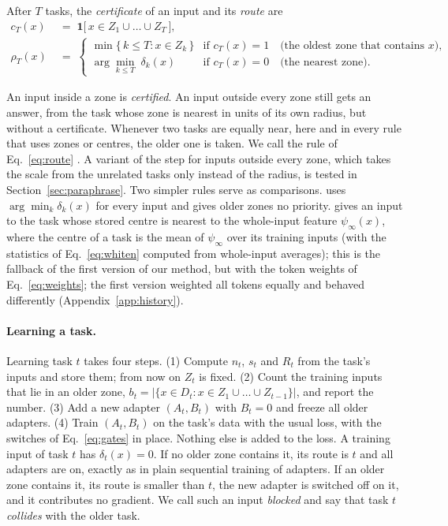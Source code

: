 \begin{definition}
After $T$ tasks, the \emph{certificate} of an input and its \emph{route} are
\begin{align}
  c_T(x) &\;=\; \mathbf{1}\bigl[\, x \in Z_1 \cup \dots \cup Z_T \,\bigr] , \label{eq:certificate}\\[2pt]
  \rho_T(x) &\;=\;
  \begin{cases}
    \min \{\, k \le T : x \in Z_k \,\} & \text{if } c_T(x) = 1 \quad \text{(the oldest zone that contains } x \text{)}, \\[2pt]
    \arg\min_{k \le T}\; \delta_k(x) & \text{if } c_T(x) = 0 \quad \text{(the nearest zone)} .
  \end{cases}
  \label{eq:route}
\end{align}
\end{definition}

An input inside a zone is \emph{certified}. An input outside every zone still gets an answer, from
the task whose zone is nearest in units of its own radius, but without a certificate. Whenever two
tasks are equally near, here and in every rule that uses zones or centres, the older one is taken. We call the
rule of Eq.~\eqref{eq:route} \cert{}. A variant of the step for inputs outside every zone, which takes the scale from the unrelated tasks only instead of the radius, is tested in Section~\ref{sec:paraphrase}. Two simpler rules serve as comparisons. \nearest{} uses
$\arg\min_k \delta_k(x)$ for every input and gives older zones no priority. \centre{} gives an input
to the task whose stored centre is nearest to the whole-input feature $\psi_\infty(x)$, where the
centre of a task is the mean of $\psi_\infty$ over its training inputs (with the statistics of
Eq.~\eqref{eq:whiten} computed from whole-input averages); this is the fallback of the first
version of our method, but with the token weights of Eq.~\eqref{eq:weights}; the first version weighted all tokens equally and
behaved differently (Appendix~\ref{app:history}).

\paragraph{Learning a task.} Learning task $t$ takes four steps. (1) Compute $n_t$, $s_t$ and $R_t$
from the task's inputs and store them; from now on $Z_t$ is fixed. (2) Count the training inputs
that lie in an older zone, $b_t = |\{x \in D_t : x \in Z_1 \cup \dots \cup Z_{t-1}\}|$,
and report the number. (3) Add a new adapter $(A_t, B_t)$ with $B_t = 0$ and freeze all older
adapters. (4) Train $(A_t, B_t)$ on the task's data with the usual loss, with the switches of
Eq.~\eqref{eq:gates} in place. Nothing else is added to the loss. A training input of task $t$
has $\delta_t(x) = 0$. If no older zone contains it, its route is $t$ and all adapters are on,
exactly as in plain sequential training of adapters. If an older zone contains it, its route is
smaller than $t$, the new adapter is switched off on it, and it contributes no gradient. We call
such an input \emph{blocked} and say that task $t$ \emph{collides} with the older task.

